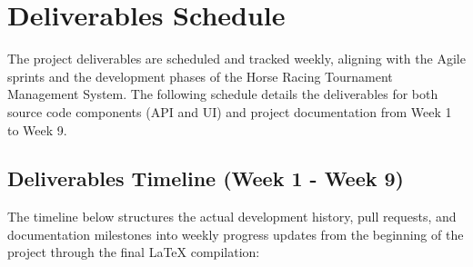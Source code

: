 \section{Deliverables Schedule}

The project deliverables are scheduled and tracked weekly, aligning with the Agile sprints and the development phases of the Horse Racing Tournament Management System. The following schedule details the deliverables for both source code components (API and UI) and project documentation from Week 1 to Week 9.

\subsection{Deliverables Timeline (Week 1 - Week 9)}

The timeline below structures the actual development history, pull requests, and documentation milestones into weekly progress updates from the beginning of the project through the final LaTeX compilation:

